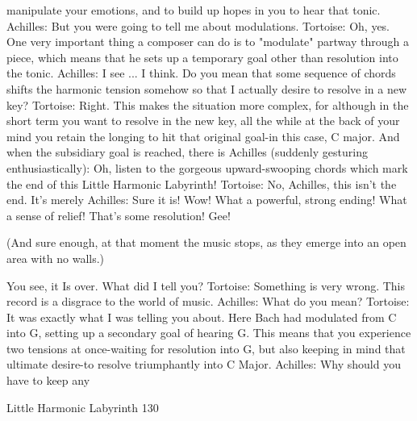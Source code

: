                     manipulate your emotions, and to build up hopes in you to hear
                    that tonic.
               Achilles: But you were going to tell me about modulations.
               Tortoise: Oh, yes. One very important thing a composer can do is to
                      "modulate" partway through a piece, which means that he sets up
                      a temporary goal other than resolution into the tonic.
               Achilles: I see ... I think. Do you mean that some sequence of chords
                      shifts the harmonic tension somehow so that I actually desire to
                      resolve in a new key?
               Tortoise: Right. This makes the situation more complex, for although in
                      the short term you want to resolve in the new key, all the while at
                      the back of your mind you retain the longing to hit that original
                      goal-in this case, C major. And when the subsidiary goal is
                      reached, there is
               Achilles (suddenly gesturing enthusiastically): Oh, listen to the gorgeous
                      upward-swooping chords which mark the end of this Little
                      Harmonic Labyrinth!
               Tortoise: No, Achilles, this isn't the end. It's merely
               Achilles: Sure it is! Wow! What a powerful, strong ending! What a sense
                      of relief! That's some resolution! Gee!

                  (And sure enough, at that moment the music stops, as they emerge into
                  an open area with no walls.)

               You see, it Is over. What did I tell you? Tortoise: Something is very
                       wrong. This record
               is a disgrace to the world of music. Achilles: What do you mean?
               Tortoise: It was exactly what I was telling you about. Here Bach had
                       modulated from C into G, setting up a secondary goal of hearing
                       G. This means that you experience two tensions at once-waiting
                       for resolution into G, but also keeping in mind that ultimate
                       desire-to resolve triumphantly into C Major.
               Achilles: Why should you have to keep any




Little Harmonic Labyrinth                                                            130

